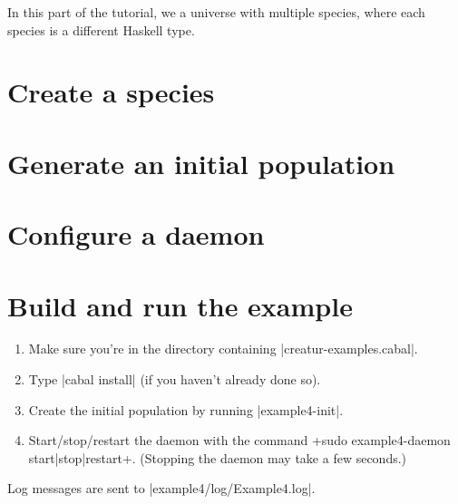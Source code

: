 \documentclass[a4paper,10pt]{report}
\begin{document}
In this part of the tutorial, we a universe with multiple species,
where each species is a different Haskell type.

\section{Create a species}
\label{sec:species4}





\section{Generate an initial population}
\label{sec:pop4}



\section{Configure a daemon}
\label{sec:daemon4}



\section{Build and run the example}
\label{sec:run4}

\begin{enumerate}
\item Make sure you're in the directory containing |creatur-examples.cabal|.
\item Type |cabal install| (if you haven't already done so).
\item Create the initial population by running |example4-init|.
\item Start/stop/restart the daemon with the command
\UndefineShortVerb{\|}
\DefineShortVerb{\+}
+sudo example4-daemon start|stop|restart+.
\UndefineShortVerb{\+}
\DefineShortVerb{\|}
(Stopping the daemon may take a few seconds.)
\end{enumerate}

Log messages are sent to |example4/log/Example4.log|.
\end{document}
